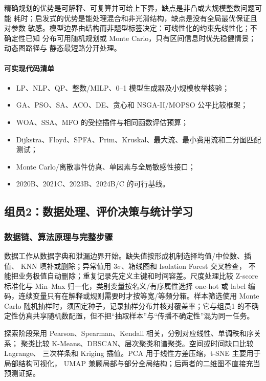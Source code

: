 \documentclass[UTF8,a4paper,12pt]{ctexart}
\begin{document}
精确规划的优势是可解释、可复算并可给上下界，缺点是非凸或大规模整数问题可能
耗时；启发式的优势是能处理混合和非光滑结构，缺点是没有全局最优保证且对参数
敏感。模型边界由结构而非题型标签决定：可线性化的约束先线性化；不确定性已知
分布可用随机规划或 Monte Carlo，只有区间信息时优先稳健情景；动态图路径与
静态最短路分开处理。

\paragraph{可实现代码清单}
\begin{itemize}
  \item LP、NLP、QP、整数/MILP、0--1 模型生成器及小规模枚举核验；
  \item GA、PSO、SA、ACO、DE、贪心和 NSGA-II/MOPSO 公平比较框架；
  \item WOA、SSA、MFO 的受控插件与相同函数评估预算；
  \item Dijkstra、Floyd、SPFA、Prim、Kruskal、最大流、最小费用流和二分图匹配测试；
  \item Monte Carlo/离散事件仿真、单因素与全局敏感性接口；
  \item 2020B、2021C、2023B、2024B/C 的可行基线。
\end{itemize}

\subsection{组员2：数据处理、评价决策与统计学习}

\subsubsection{数据链、算法原理与完整步骤}

数据工作从数据字典和泄漏边界开始。缺失值按形成机制选择均值/中位数、插值、
KNN 填补或删除；异常值用 $3\sigma$、箱线图和 Isolation Forest 交叉检查，
不能把业务极值自动删除；重复记录先定义主键和时间容差。尺度处理比较
Z-score 标准化与 Min--Max 归一化，类别变量按名义/有序属性选择 one-hot 或
label 编码，连续变量只有在解释或规则需要时才按等宽/等频分箱。样本筛选使用
Monte Carlo 随机抽样时，须固定种子，记录抽样分布并核对覆盖率；它与组员1
的不确定性仿真共享随机数配置，但不把“抽取样本”与“传播不确定性”混为同一任务。

探索阶段采用 Pearson、Spearman、Kendall 相关，分别对应线性、单调秩和序关系；
聚类比较 K-Means、DBSCAN、层次聚类和谱聚类。空间或时间缺口比较 Lagrange、
三次样条和 Kriging 插值。PCA 用于线性方差压缩，t-SNE 主要用于局部结构可视化，
UMAP 兼顾局部与部分全局结构；后两者的二维图不直接充当预测证据。
\end{document}
